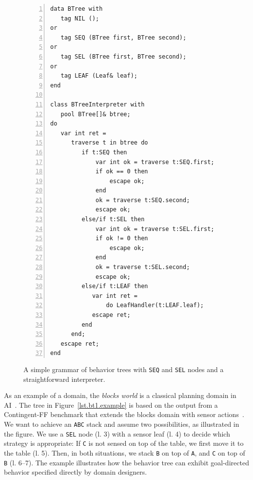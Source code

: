 \documentclass{sig-alternate}
\newcommand{\CEU}{\textsc{C\'{e}u}\xspace}
\newcommand{\code}[1] {{\small{\texttt{#1}}}}
\begin{document}
\begin{figure}[t]
\begin{lstlisting}[numbers=left,xleftmargin=3em]
data BTree with
   tag NIL ();
or
   tag SEQ (BTree first, BTree second);
or
   tag SEL (BTree first, BTree second);
or
   tag LEAF (Leaf& leaf);
end

class BTreeInterpreter with
   pool BTree[]& btree;
do
   var int ret =
      traverse t in btree do
         if t:SEQ then
             var int ok = traverse t:SEQ.first;
             if ok == 0 then
                 escape ok;
             end
             ok = traverse t:SEQ.second;
             escape ok;
         else/if t:SEL then
             var int ok = traverse t:SEL.first;
             if ok != 0 then
                 escape ok;
             end
             ok = traverse t:SEL.second;
             escape ok;
         else/if t:LEAF then
            var int ret =
                do LeafHandler(t:LEAF.leaf);
            escape ret;
         end
      end;
   escape ret;
end
\end{lstlisting}
\caption{
A simple grammar of behavior trees with \code{SEQ} and \code{SEL} nodes and a 
straightforward interpreter.
\label{lst.bt1}
}
\end{figure}

As an example of a domain, the \emph{blocks world} is a classical planning 
domain in AI~\cite{slaney2001blocks}.
%
The tree in Figure~\ref{lst.bt1.example} is based on the output from a
Contingent-FF benchmark that extends the blocks domain with sensor 
actions~\cite{hoffmann2005contingent}.
%
%
We want to achieve an \code{ABC} stack and assume two possibilities, as 
illustrated in the figure.
%
We use a \code{SEL} node (l. 3) with a sensor leaf (l. 4) to decide which 
strategy is appropriate:
If \code{C} is not sensed on top of the table, we first move it to the table 
(l. 5).
Then, in both situations, we stack \code{B} on top of \code{A}, and \code{C} on 
top of \code{B} (l. 6--7).
%
%
The example illustrates how the behavior tree can exhibit goal-directed 
behavior specified directly by domain designers.
%
\end{document}
